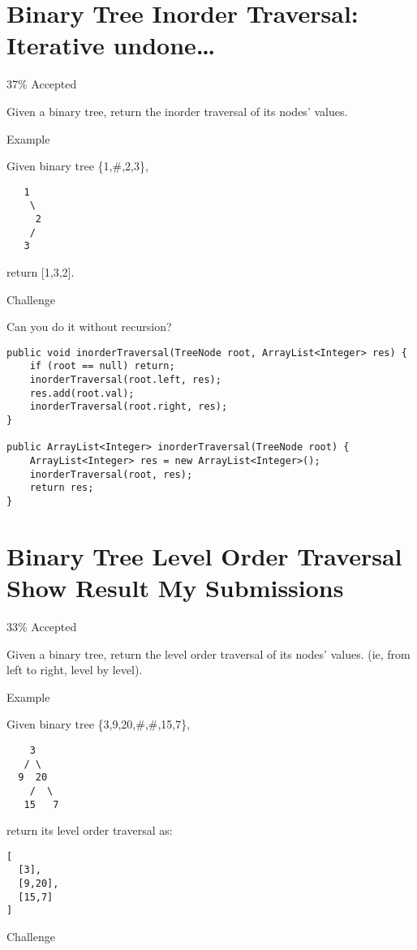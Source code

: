 \documentclass[9pt, b5paaper]{book}
\begin{document}
\section{Binary Tree Inorder Traversal: Iterative undone\ldots{}}
\label{sec-5-16}

37\% Accepted

Given a binary tree, return the inorder traversal of its nodes' values.

Example

Given binary tree \{1,\#,2,3\},
\begin{verbatim}
   1
    \
     2
    /
   3
\end{verbatim}

return [1,3,2].

Challenge

Can you do it without recursion?
\begin{verbatim}
public void inorderTraversal(TreeNode root, ArrayList<Integer> res) {
    if (root == null) return;
    inorderTraversal(root.left, res);
    res.add(root.val);
    inorderTraversal(root.right, res);
}
        
public ArrayList<Integer> inorderTraversal(TreeNode root) {
    ArrayList<Integer> res = new ArrayList<Integer>();
    inorderTraversal(root, res);
    return res;
}
\end{verbatim}
\section{Binary Tree Level Order Traversal Show Result My Submissions}
\label{sec-5-17}

33\% Accepted

Given a binary tree, return the level order traversal of its nodes' values. (ie, from left to right, level by level).

Example

Given binary tree \{3,9,20,\#,\#,15,7\},
\begin{verbatim}
    3
   / \
  9  20
    /  \
   15   7
\end{verbatim}

return its level order traversal as:
\begin{verbatim}
[
  [3],
  [9,20],
  [15,7]
]
\end{verbatim}

Challenge
\end{document}
